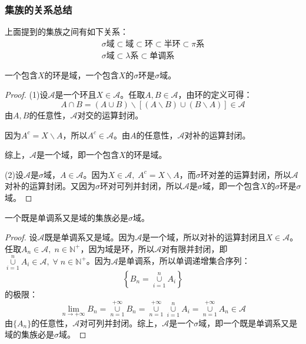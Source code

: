 \subsubsection{集族的关系总结}
上面提到的集族之间有如下关系：
\begin{gather*}
	\text{$\sigma$域}\subset\text{域}\subset\text{环}\subset\text{半环}\subset\text{$\pi$系} \\
	\text{$\sigma$域}\subset\text{$\lambda$系}\subset\text{单调系}
\end{gather*}
\begin{theorem}\label{theo:RingContainX=Field}
	一个包含$X$的环是域，一个包含$X$的$\sigma$环是$\sigma$域。
\end{theorem}
\begin{proof}
	(1)设$\mathscr{A}$是一个环且$X\in\mathscr{A}$。任取$A,B\in\mathscr{A}$，由环的定义可得：
	\begin{equation*}
		A\cap B=(A\cup B)\backslash[(A\backslash B)\cup (B\backslash A)]\in\mathscr{A}
	\end{equation*}
	由$A,B$的任意性，$\mathscr{A}$对交的运算封闭。\par
	因为$A^c=X\backslash A$，所以$A^c\in\mathscr{A}$。由$A$的任意性，$\mathscr{A}$对补的运算封闭。\par
	综上，$\mathscr{A}$是一个域，即一个包含$X$的环是域。\par
	(2)设$\mathscr{A}$是$\sigma$域，$A\in\mathscr{A}$。因为$X\in\mathscr{A},\;A^c=X\backslash A$，而$\sigma$环对差的运算封闭，所以$\mathscr{A}$对补的运算封闭。又因为$\sigma$环对可列并封闭，所以$\mathscr{A}$是$\sigma$域，即一个包含$X$的$\sigma$环是$\sigma$域。
\end{proof}
\begin{theorem}\label{theo:Monotone+Field=SigmaField}
	一个既是单调系又是域的集族必是$\sigma$域。
\end{theorem}
\begin{proof}
	设$\mathscr{A}$既是单调系又是域。因为$\mathscr{A}$是一个域，所以对补的运算封闭且$X\in\mathscr{A}$。任取$A_n\in\mathscr{A},\;n\in\mathbb{N}^+$，因为域是环，所以$\mathscr{A}$对有限并封闭，即$\underset{i=1}{\overset{n}{\cup}}A_i\in\mathscr{A},\;\forall\;n\in\mathbb{N}^+$。因为$\mathscr{A}$是单调系，所以单调递增集合序列：
	\begin{equation*}
		\left\{B_n=\underset{i=1}{\overset{n}{\cup}}A_i\right\}
	\end{equation*}
	的极限：
	\begin{equation*}
		\lim_{n\to+\infty}B_n=\underset{n=1}{\overset{+\infty}{\cup}}B_n=\underset{n=1}{\overset{+\infty}{\cup}}\underset{i=1}{\overset{n}{\cup}}A_i=\underset{n=1}{\overset{+\infty}{\cup}}A_n\in\mathscr{A}
	\end{equation*}
	由$\{A_n\}$的任意性，$\mathscr{A}$对可列并封闭。综上，$\mathscr{A}$是一个$\sigma$域，即一个既是单调系又是域的集族必是$\sigma$域。
\end{proof}
